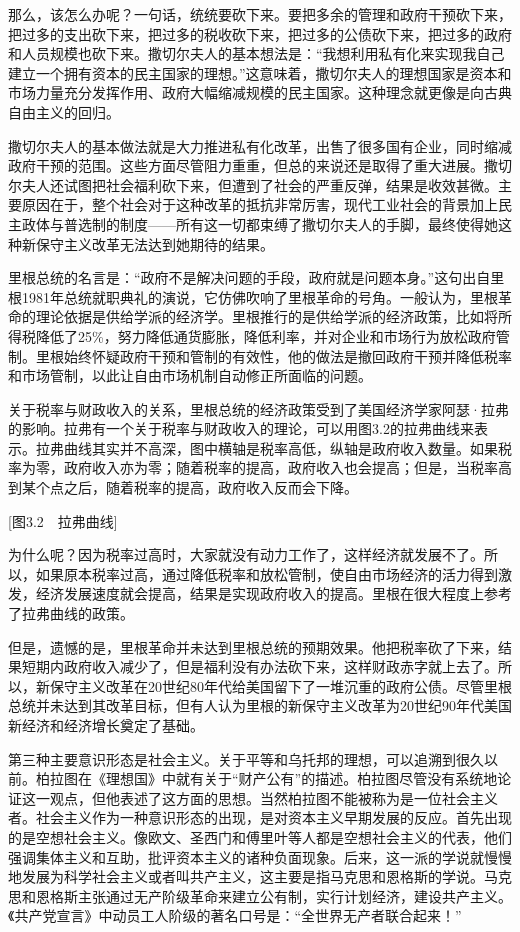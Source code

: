 那么，该怎么办呢？一句话，统统要砍下来。要把多余的管理和政府干预砍下来，把过多的支出砍下来，把过多的税收砍下来，把过多的公债砍下来，把过多的政府和人员规模也砍下来。撒切尔夫人的基本想法是：“我想利用私有化来实现我自己建立一个拥有资本的民主国家的理想。”这意味着，撒切尔夫人的理想国家是资本和市场力量充分发挥作用、政府大幅缩减规模的民主国家。这种理念就更像是向古典自由主义的回归。

撒切尔夫人的基本做法就是大力推进私有化改革，出售了很多国有企业，同时缩减政府干预的范围。这些方面尽管阻力重重，但总的来说还是取得了重大进展。撒切尔夫人还试图把社会福利砍下来，但遭到了社会的严重反弹，结果是收效甚微。主要原因在于，整个社会对于这种改革的抵抗非常厉害，现代工业社会的背景加上民主政体与普选制的制度——所有这一切都束缚了撒切尔夫人的手脚，最终使得她这种新保守主义改革无法达到她期待的结果。

里根总统的名言是：“政府不是解决问题的手段，政府就是问题本身。”这句出自里根1981年总统就职典礼的演说，它仿佛吹响了里根革命的号角。一般认为，里根革命的理论依据是供给学派的经济学。里根推行的是供给学派的经济政策，比如将所得税降低了25\%，努力降低通货膨胀，降低利率，并对企业和市场行为放松政府管制。里根始终怀疑政府干预和管制的有效性，他的做法是撤回政府干预并降低税率和市场管制，以此让自由市场机制自动修正所面临的问题。

关于税率与财政收入的关系，里根总统的经济政策受到了美国经济学家阿瑟·拉弗的影响。拉弗有一个关于税率与财政收入的理论，可以用图3.2的拉弗曲线来表示。拉弗曲线其实并不高深，图中横轴是税率高低，纵轴是政府收入数量。如果税率为零，政府收入亦为零；随着税率的提高，政府收入也会提高；但是，当税率高到某个点之后，随着税率的提高，政府收入反而会下降。

[图3.2　拉弗曲线]

为什么呢？因为税率过高时，大家就没有动力工作了，这样经济就发展不了。所以，如果原本税率过高，通过降低税率和放松管制，使自由市场经济的活力得到激发，经济发展速度就会提高，结果是实现政府收入的提高。里根在很大程度上参考了拉弗曲线的政策。

但是，遗憾的是，里根革命并未达到里根总统的预期效果。他把税率砍了下来，结果短期内政府收入减少了，但是福利没有办法砍下来，这样财政赤字就上去了。所以，新保守主义改革在20世纪80年代给美国留下了一堆沉重的政府公债。尽管里根总统并未达到其改革目标，但有人认为里根的新保守主义改革为20世纪90年代美国新经济和经济增长奠定了基础。


第三种主要意识形态是社会主义。关于平等和乌托邦的理想，可以追溯到很久以前。柏拉图在《理想国》中就有关于“财产公有”的描述。柏拉图尽管没有系统地论证这一观点，但他表述了这方面的思想。当然柏拉图不能被称为是一位社会主义者。社会主义作为一种意识形态的出现，是对资本主义早期发展的反应。首先出现的是空想社会主义。像欧文、圣西门和傅里叶等人都是空想社会主义的代表，他们强调集体主义和互助，批评资本主义的诸种负面现象。后来，这一派的学说就慢慢地发展为科学社会主义或者叫共产主义，这主要是指马克思和恩格斯的学说。马克思和恩格斯主张通过无产阶级革命来建立公有制，实行计划经济，建设共产主义。《共产党宣言》中动员工人阶级的著名口号是：“全世界无产者联合起来！”

